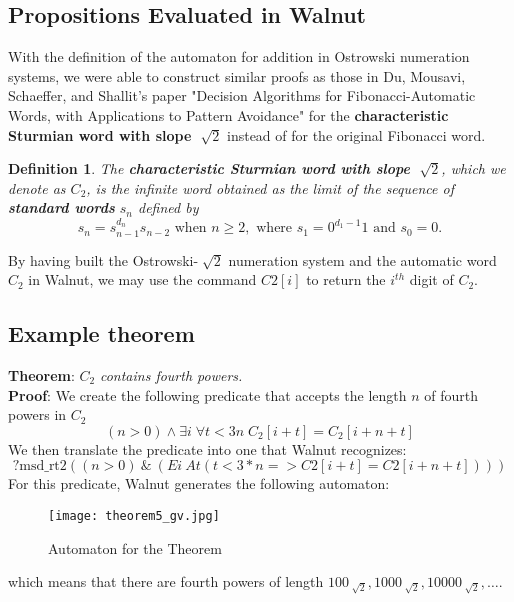 \documentclass[landscape]{sciposter}
\newtheorem*{definition}{Definition}
\begin{document}
\begin{multicols}{3}
\begin{minipage}{\columnwidth}
\end{minipage}

\section*{Propositions Evaluated in Walnut}

With the definition of the automaton for addition in Ostrowski numeration systems, we were able to construct similar proofs as those in Du, Mousavi, Schaeffer, and Shallit's paper "Decision Algorithms for Fibonacci-Automatic Words, with Applications to Pattern Avoidance" for the \textbf{characteristic Sturmian word with slope $\sqrt[~]{2}$} instead of for the original Fibonacci word.
\vspace*{0.4em}
\begin{definition}
The \textbf{characteristic Sturmian word with slope $\sqrt[~]{2}$}, which we denote as $C_2$, is the infinite word obtained as the limit of the sequence of \textbf{standard words} $s_n$ defined by{
\setlength{\abovedisplayskip}{3pt}
\setlength{\belowdisplayskip}{3pt}
$$ s_n=s^{d_n}_{n-1}s_{n-2} \text{ when } n\ge 2, \text{ where } s_1= 0^{d_1-1}1 \text{ and } s_0=0.$$}
\end{definition}
By having built the Ostrowski-$\sqrt[~]{2}$ numeration system and the automatic word $C_2$ in Walnut, we may use the command $C2[i]$ to return the $i^{th}$ digit of $C_2$.\\

\begin{mdframed}[style=MyFrame]
\subsection*{Example theorem}
\end{mdframed}

\textbf{Theorem}: \textbf{$C_2$} \textit{contains fourth powers.}
\\

\textbf{Proof}: We create the following predicate that accepts the length $n$ of fourth powers in $C_2$
\setlength{\abovedisplayskip}{3pt}
\setlength{\belowdisplayskip}{3pt}
$$(n > 0) \land \exists i \; \forall t<3n \;C_2[i+t] = C_2[i+n+t]$$
We then translate the predicate into one that Walnut recognizes:
$$ ? \text{msd}\_\text{rt2} ((n>0)~\&~(Ei~At (t<3 \ast n => C2[i+t] = C2[i+n+t])))$$
For this predicate, Walnut generates the following automaton:
\\
\begin{figure}
\centering
\texttt{[image: theorem5\_gv.jpg]}
    \caption{Automaton for the Theorem}
    \label{fig:Theorem}
\end{figure}
which means that there are fourth powers of length $100_{\sqrt[~]{2}},1000_{\sqrt[~]{2}},10000_{\sqrt[~]{2}},\dots$.

\end{multicols}
\end{document}
